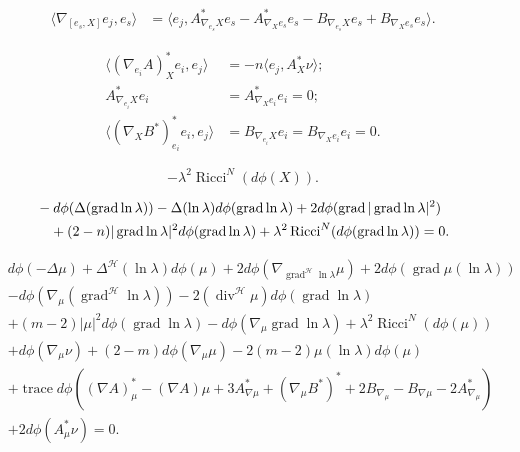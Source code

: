 \documentclass[12pt]{article}
\begin{document}
\begin{align*}
\langle \nabla_{[e_{s},X]} e_{j} , e_{s} \rangle &= \langle e_{j} , A^{*}_{\nabla_{e_{s}}X} e_{s} -A^{*}_{\nabla_{X}e_{s}} e_{s} -
B_{\nabla_{e_{s}}X} e_{s} + B_{\nabla_{X}e_{s}} e_{s} \rangle .
\end{align*}

\begin{align*}
 \langle (\nabla_{e_{i}}A)^{*}_{X} e_{i}, e_{j}\rangle &= - n\langle  e_{j} , A^{*}_{X}\nu \rangle ;\\
 A^{*}_{\nabla_{e_{i}} X} e_{i} &=  A^{*}_{\nabla_{X}e_{i}} e_{i} = 0 ;\\
\langle (\nabla_{X}B^{*})^{*}_{e_{i}} e_{i}, e_{j}\rangle &= 
 B_{\nabla_{e_{i}}X}e_{i} = B_{\nabla_{X} e_{i}}  e_{i}  = 0.
\end{align*}

$$-\lambda^2 \operatorname{Ricci}^{N}(d\phi(X)).$$

\begin{align}
&- d\phi( \Delta (\operatorname{grad} \ln\lambda)) -\Delta(\ln \lambda) d\phi(\operatorname{grad} \ln \lambda) +  2 d\phi(\operatorname{grad} |\operatorname{grad} \ln \lambda|^2 )  \notag\\
& \quad + (2-n) |\operatorname{grad} \ln \lambda|^2 d\phi(\operatorname{grad} \ln \lambda)  + \lambda^2
\operatorname{Ricci}^{N}(d\phi(\operatorname{grad}\ln\lambda)) =0. \label{eqf}
\end{align}

\begin{align*}
&d\phi(-\Delta \mu)+ \Delta^{\mathcal{H}} (\ln\lambda) d\phi(\mu) + 2 d\phi(\nabla_{\operatorname{grad}^{\mathcal{H}} \ln\lambda} \mu) + 2d\phi(\operatorname{grad} \mu(\ln\lambda)) \\
& -d\phi(\nabla_{\mu} (\operatorname{grad}^{\mathcal{H}}\ln\lambda)) -2 (\operatorname{div}^{\mathcal{H}} \mu) d\phi(\operatorname{grad} \ln\lambda)  \\
&   +(m-2) |\mu |^2 d\phi(\operatorname{grad} \ln\lambda)  - d\phi (\nabla_{\mu} \operatorname{grad} \ln\lambda) + \lambda^2\operatorname{Ricci}^{N}(d\phi(\mu)) \\
&   + d\phi(\nabla_{\mu} \nu) + (2-m) d\phi(\nabla_{\mu}\mu)  -2(m-2)\mu(\ln\lambda) d\phi(\mu)\\
&+  \operatorname{trace} d\phi( (\nabla A)^{*}_{\mu} - (\nabla A)\mu + 3A^{*}_{\nabla \mu} +
(\nabla_{\mu} B^{*})^{*} + 2 B_{\nabla_{\mu}}- B_{\nabla \mu} -2
A^{*}_{\nabla_{\mu}}) \\
&+ 2 d\phi(A^{*}_{\mu}\nu) = 0.
\end{align*}
\end{document}
